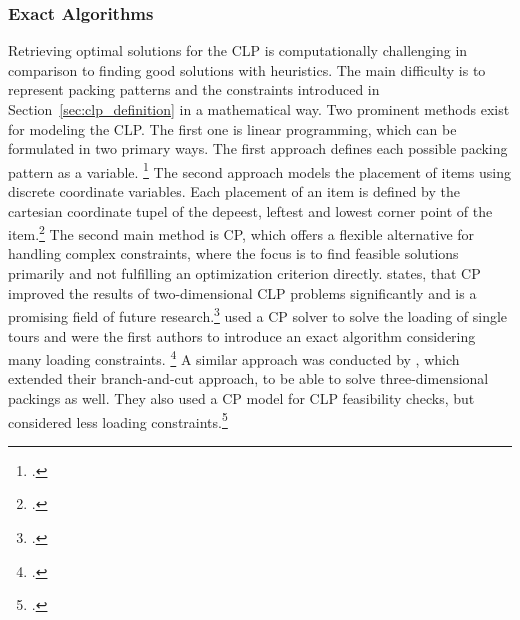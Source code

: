 \subsubsection{Exact Algorithms}
Retrieving optimal solutions for the \gls{CLP} is computationally challenging in comparison
to finding good solutions with heuristics. The main difficulty is to represent packing
patterns and the constraints introduced in Section~\ref{sec:clp_definition} in a mathematical way.
Two prominent methods exist for modeling the \gls{CLP}. The first one is linear programming, which can be
formulated in two primary ways. The first approach defines each possible packing pattern as
a variable. \footcite[cf.][p. 29f]{zhu_prototype_2012} The second approach models
the placement of items using discrete coordinate variables. Each placement of an item
is defined by the cartesian coordinate tupel of the depeest, leftest and lowest corner point of
the item.\footcites(cf.)()[][pp. 649--653]{junqueira_optimization_2013}[][pp. 4--8]{moura_integrated_2009}
The second main method is \gls{CP}, which offers a flexible alternative for handling
complex constraints, where the focus is to find feasible solutions primarily and
not fulfilling an optimization criterion directly. \textcite{iori_exact_2021} states, that
\gls{CP} improved the results of two-dimensional \gls{CLP} problems significantly and is a promising
field of future research.\footcite[cf.][p. 23]{iori_exact_2021} \cite{tamke_branch-and-cut_2024} used a \gls{CP} solver
to solve the loading of single tours and were the first authors to introduce an exact algorithm
considering many loading constraints. \footcite[cf.][pp. 7--11]{tamke_branch-and-cut_2024}
A similar approach was conducted by \cite{hokama_branch-and-cut_2016}, which extended their
branch-and-cut approach, to be able to solve three-dimensional packings as well.
They also used a \gls{CP} model for \gls{CLP} feasibility checks, but considered less loading constraints.\footcite[cf.][]{hokama_branch-and-cut_2016}

\parbreak

